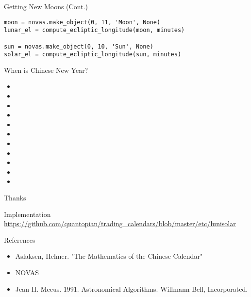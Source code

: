 \documentclass[table]{beamer}
\begin{document}
\begin{frame}[fragile]{Getting New Moons (Cont.)}
  \begin{verbatim}
moon = novas.make_object(0, 11, 'Moon', None)
lunar_el = compute_ecliptic_longitude(moon, minutes)

sun = novas.make_object(0, 10, 'Sun', None)
solar_el = compute_ecliptic_longitude(sun, minutes)
  \end{verbatim}
\end{frame}

\begin{frame}{When is Chinese New Year?}
  \begin{itemize}
  \item[] 
  \item[] 
  \item[] 
  \item[] 
  \item[] 
  \item[] 
  \item[] 
  \item[] 
  \item[] 
  \item[] 
  \item[] 
  \end{itemize}
\end{frame}

\begin{frame}{Thanks}
  \begin{block}{Implementation}
    \url{https://github.com/quantopian/trading_calendars/blob/master/etc/lunisolar}
  \end{block}
  \begin{block}{References}
    \begin{itemize}
    \item Aslaksen, Helmer. "The Mathematics of the Chinese Calendar"
    \item NOVAS
    \item Jean H. Meeus. 1991. Astronomical Algorithms. Willmann-Bell,
      Incorporated.
    \end{itemize}
  \end{block}
\end{frame}
\end{document}
